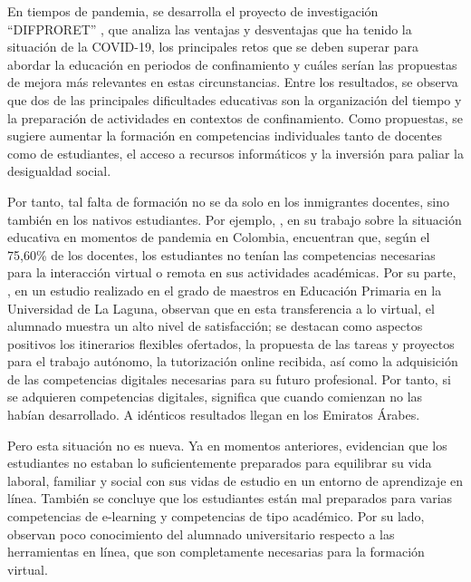 \documentclass[spanish]{textolivre}
\begin{document}
En tiempos de pandemia, se desarrolla el proyecto de investigación “DIFPRORET” \cite{burgos2020difproret}, que analiza las ventajas y desventajas que ha tenido la situación de la COVID-19, los principales retos que se deben superar para abordar la educación en periodos de confinamiento y cuáles serían las propuestas de mejora más relevantes en estas circunstancias. Entre los resultados, se observa que dos de las principales dificultades educativas son la organización del tiempo y la preparación de actividades en contextos de confinamiento. Como propuestas, se sugiere aumentar la formación en competencias individuales tanto de docentes como de estudiantes, el acceso a recursos informáticos y la inversión para paliar la desigualdad social. 

Por tanto, tal falta de formación no se da solo en los inmigrantes docentes, sino también en los nativos estudiantes. Por ejemplo, \textcite{gonzalez2020docencia}, en su trabajo sobre la situación educativa en momentos de pandemia en Colombia, encuentran que, según el 75,60\% de los docentes, los estudiantes no tenían las competencias necesarias para la interacción virtual o remota en sus actividades académicas. Por su parte, \textcite{area2020ensenanza}, en un estudio realizado en el grado de maestros en Educación Primaria en la Universidad de La Laguna, observan que en esta transferencia a lo virtual, el alumnado muestra un alto nivel de satisfacción; se destacan como aspectos positivos los itinerarios flexibles ofertados, la propuesta de las tareas y proyectos para el trabajo autónomo, la tutorización online recibida, así como la adquisición de las competencias digitales necesarias para su futuro profesional. Por tanto, si se adquieren competencias digitales, significa que cuando comienzan no las habían desarrollado. A idénticos resultados llegan \textcite{snoussi2020distance} en los Emiratos Árabes.

Pero esta situación no es nueva. Ya en momentos anteriores, \textcite{parkes_student_2015} evidencian que los estudiantes no estaban lo suficientemente preparados para equilibrar su vida laboral, familiar y social con sus vidas de estudio en un entorno de aprendizaje en línea. También se concluye que los estudiantes están mal preparados para varias competencias de e-learning y competencias de tipo académico. Por su lado, \textcite{araujo-vila_digital_2020} observan poco conocimiento del alumnado universitario respecto a las herramientas en línea, que son completamente necesarias para la formación virtual.  
\end{document}
